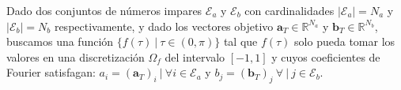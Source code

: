 \begin{problem}\label{SHEp_2LVL}
    Dado dos conjuntos de números impares $\mathcal{E}_a$ y $\mathcal{E}_b$ con cardinalidades $|\mathcal{E}_a| = N_a$ y  $|\mathcal{E}_b| = N_b$ respectivamente, y dado los vectores objetivo $\bm{a}_T  \in \mathbb{R}^{N_a}$ y $\bm{b}_T  \in \mathbb{R}^{N_b}$, buscamos una función  $\{f(\tau ) \ | \ \tau \in (0,\pi)\}$ tal que $f(\tau)$ solo pueda tomar los valores en una discretización $\Omega_f$ del intervalo $[-1,1]$ y cuyos coeficientes de Fourier satisfagan: $ a_i = (\bm{a}_T)_i \ | \ \forall i \in \mathcal{E}_a$ y  $b_j = (\bm{b}_T)_j \ \forall \ | \  j \in \mathcal{E}_b$. 
\end{problem}




